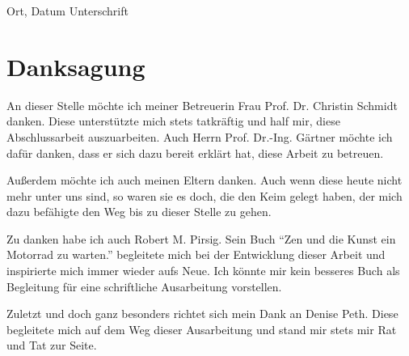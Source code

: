 \vspace{4cm}

\hspace{2cm} Ort, Datum \hfill Unterschrift \hspace{2cm}


\newpage

\section*{Danksagung}

An dieser Stelle möchte ich  meiner Betreuerin Frau Prof. Dr. Christin Schmidt danken. Diese unterstützte mich stets tatkräftig und half mir, diese Abschlussarbeit auszuarbeiten. Auch Herrn Prof. Dr.-Ing. Gärtner möchte ich dafür danken, dass er sich dazu bereit erklärt hat, diese Arbeit zu betreuen.

Außerdem möchte ich auch  meinen Eltern danken. Auch wenn diese heute nicht mehr unter uns sind, so waren sie es doch, die den Keim gelegt haben, der mich dazu befähigte den Weg bis zu dieser Stelle zu gehen.

Zu danken habe ich auch Robert M. Pirsig. Sein Buch "`Zen und die Kunst ein Motorrad zu warten."' begleitete mich bei der Entwicklung dieser Arbeit und inspirierte mich immer wieder aufs Neue. Ich könnte mir kein besseres Buch als Begleitung für eine schriftliche Ausarbeitung vorstellen.

Zuletzt und doch ganz besonders richtet sich mein Dank an  Denise Peth. Diese begleitete mich auf dem Weg dieser Ausarbeitung und stand mir stets mir Rat und Tat zur Seite.


